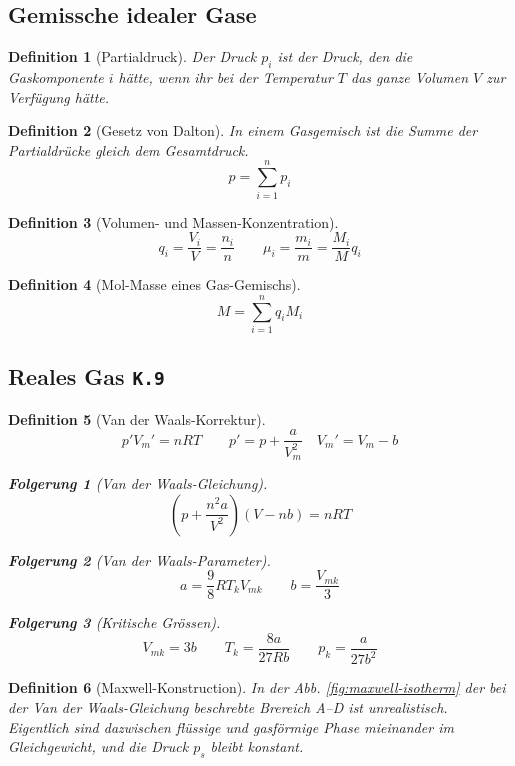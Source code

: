 \documentclass[a4paper, twocolumn]{article}
\numberwithin{equation}{section}
\theoremstyle{hsr-def}
\newtheorem{definition}{Definition}[section]
\theoremstyle{hsr-sub}
\newtheorem{result}{Folgerung}[definition]
\newcommand{\fromlecture}[1]{\textcolor{red!70!black}{\small\texttt{K.#1}}}
\begin{document}
\subsection{Gemissche idealer Gase}
\begin{definition}[Partialdruck]
Der Druck \(p_i\) ist der Druck, den die Gaskomponente \(i\) h\"atte, wenn ihr bei der Temperatur \(T\) das ganze Volumen \(V\) zur Verf\"ugung h\"atte.
\end{definition}

\begin{definition}[Gesetz von Dalton]
In einem Gasgemisch ist die Summe der Partialdr\"ucke gleich dem Gesamtdruck.
\[
    p = \sum_{i = 1}^n p_i
\]
\end{definition}

\begin{definition}[Volumen- und Massen-Konzentration]
\[
    q_i = \frac{V_i}{V} = \frac{n_i}{n}
    \qquad
    \mu_i = \frac{m_i}{m} = \frac{M_i}{M} q_i
\]
\end{definition}

\begin{definition}[Mol-Masse eines Gas-Gemischs]
\[
    M = \sum_{i = 1}^n q_i M_i
\]
\end{definition}

\subsection{Reales Gas \fromlecture{9}}
\begin{definition}[Van der Waals-Korrektur]
\[
    p'V_m' = nRT
    \qquad
    p' = p + \frac{a}{V_m^2}
    \quad
    V_m' = V_m - b
\]

\begin{result}[Van der Waals-Gleichung]
\[
    \left(p + \frac{n^2 a}{V^2} \right)(V - nb) = nRT
\]
\end{result}

\begin{result}[Van der Waals-Parameter]
\[
    a = \frac{9}{8} R T_k V_{mk}
    \qquad
    b = \frac{V_{mk}}{3}
\]
\end{result}

\begin{result}[Kritische Gr\"ossen]
\[
    V_{mk} = 3b
    \qquad
    T_k = \frac{8a}{27Rb}
    \qquad
    p_k = \frac{a}{27b^2}
\]
\end{result}
\end{definition}

\begin{definition}[Maxwell-Konstruction] In der Abb. \ref{fig:maxwell-isotherm} der bei der Van der Waals-Gleichung beschrebte Brereich A--D ist unrealistisch. Eigentlich sind dazwischen fl\"ussige und gasf\"ormige Phase mieinander im Gleichgewicht, und die Druck \(p_s\) bleibt konstant.
\end{definition}
\end{document}
